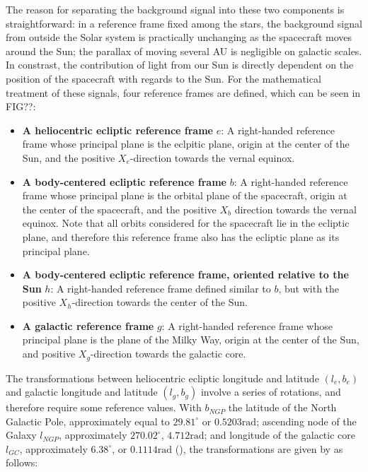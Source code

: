 The reason for separating the background signal into these two components is straightforward: in a reference frame fixed among the stars, the background signal from outside the Solar system is practically unchanging as the spacecraft moves around the Sun; the parallax of moving several AU is negligible on galactic scales. In constrast, the contribution of light from our Sun is directly dependent on the position of the spacecraft with regards to the Sun. For the mathematical treatment of these signals, four reference frames are defined, which can be seen in FIG??:

\begin{itemize}
 \item \textbf{A heliocentric ecliptic reference frame} $e$: A right-handed reference frame whose principal plane is the eclpitic plane, origin at the center of the Sun, and the positive $X_e$-direction towards the vernal equinox.
 \item \textbf{A body-centered ecliptic reference frame} $b$: A right-handed reference frame whose principal plane is the orbital plane of the spacecraft, origin at the center of the spacecraft, and the positive $X_b$ direction towards the vernal equinox. Note that all orbits considered for the spacecraft lie in the ecliptic plane, and therefore this reference frame also has the ecliptic plane as its principal plane.
 \item \textbf{A body-centered ecliptic reference frame, oriented relative to the Sun} $h$: A right-handed reference frame defined similar to $b$, but with the positive $X_h$-direction towards the center of the Sun.
 \item \textbf{A galactic reference frame} $g$: A right-handed reference frame whose principal plane is the plane of the Milky Way, origin at the center of the Sun, and positive $X_g$-direction towards the galactic core.
\end{itemize}


The transformations between heliocentric ecliptic longitude and latitude $(l_e, b_e)$ and galactic longitude and latitude $(l_g, b_g)$ involve a series of rotations, and therefore require some reference values. With $b_{NGP}$ the latitude of the North Galactic Pole, approximately equal to $29.81^\circ$ or $0.5203 \mathrm{rad}$; ascending node of the Galaxy $l_{NGP}$, approximately $270.02^\circ$, $4.712 \mathrm{rad}$; and longitude of the galactic core $l_{GC}$, approximately $6.38^\circ$, or $0.1114 \mathrm{rad}$ (\cite{SkyBrightness}), the transformations are given by \cite{SkyBrightness} as follows:

